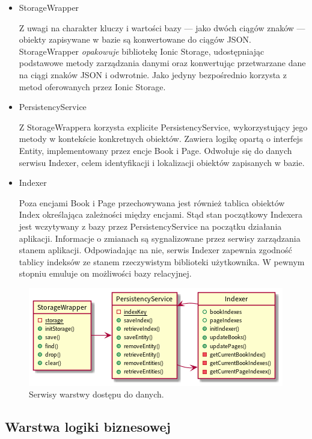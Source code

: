 \begin{itemize}
	\item StorageWrapper

	      Z uwagi na charakter kluczy i wartości bazy — jako dwóch ciągów znaków — obiekty zapisywane w bazie są
	      konwertowane do ciągów JSON. StorageWrapper \textit{opakowuje} bibliotekę Ionic Storage, udostępniając podstawowe
	      metody zarządzania danymi oraz konwertując przetwarzane dane na ciągi znaków JSON i odwrotnie.
	      Jako jedyny bezpośrednio korzysta z metod oferowanych przez Ionic Storage.
	\item PersistencyService

	      Z StorageWrappera korzysta explicite PersistencyService, wykorzystujący jego metody w kontekście konkretnych obiektów.
	      Zawiera logikę opartą o interfejs Entity, implementowany przez encje Book i Page. Odwołuje się do danych
	      serwisu Indexer, celem identyfikacji i lokalizacji obiektów zapisanych w bazie.
	\item Indexer

	      Poza encjami Book i Page przechowywana jest również tablica obiektów Index określająca
	      zależności między encjami. Stąd stan początkowy Indexera jest wczytywany z bazy przez PersistencyService
	      na początku działania aplikacji.
	      Informacje o zmianach są sygnalizowane przez serwisy zarządzania stanem aplikacji.
	      Odpowiadając na nie, serwis Indexer zapewnia zgodność tablicy indeksów ze stanem rzeczywistym
	      biblioteki użytkownika. W pewnym stopniu emuluje on możliwości bazy relacyjnej.
\end{itemize}

\begin{figure}[H]
	\begin{center}
		\includegraphics[scale=0.9]{media/PersistencyLayer.png}
	\end{center}
	\caption{Serwisy warstwy dostępu do danych.}
	\label{rys:persistency-layer}
\end{figure}

\subsection{Warstwa logiki biznesowej}
